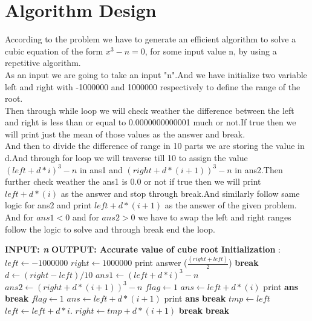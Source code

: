 \documentclass[conference]{IEEEtran}
\begin{document}
\section{\textbf{Algorithm Design}}
According to the problem we have to generate an efficient algorithm  to solve a cubic equation of the form $x^3-n=0$, for some input value n, by using a repetitive algorithm.\\

As an input we are going to take an input "n".And we have initialize two variable left and right with -1000000 and 1000000 respectively to define the range of the root.\\

Then through while loop we will check weather the difference between the left and right is less than or equal to 0.0000000000001 much or not.If true then we will print just the mean of those values as the answer and break.\\

And then to divide the difference of range in 10 parts we are storing the value in d.And through for loop we will traverse till 10  to assign the value $(left + d*i)^3 - n$ in ans1 and $(right + d*(i+1))^3 - n$ in ans2.Then further check weather the ans1 is 0.0 or not if true then we will print $left+d*(i)$ as the answer and stop through break.And similarly follow same logic for ans2 and print $left+d*(i+1)$ as the answer of the given problem.\\

And for $ans1 < 0$ and for $ans2 > 0$ we have to swap the left and right ranges follow the logic to solve and through break end the loop.\\


\begin{algorithm}[H]
\caption{}
\end{algorithm}
\begin{algorithmic}[1]
\STATE \textbf{INPUT: \textit{n}}
\STATE \textbf{OUTPUT: Accurate value of cube root}
\STATE \textbf{Initialization} : $\textit{left} \gets -1000000$ $\textit{right} \gets 1000000$ 
   	\STATE print answer ($\frac{(right+left)}{2}$)
    \STATE \textbf{break}
    \ENDIF
    \STATE $d \gets (right-left)/10 $
    	\STATE $ans1 \gets (left + d*i)^3 - n$
        \STATE $ans2 \gets (right+ d*(i+1))^3-n$
        	\STATE $flag \gets 1$
            \STATE $ans \gets left+d*(i)$
            \STATE print \textbf{ans}
            \STATE \textbf{break}
        \ENDIF
        	\STATE $flag \gets 1$
            \STATE $ans \gets left+d*(i+1)$
            \STATE print \textbf{ans}
            \STATE \textbf{break}
        \ENDIF
        	\STATE $tmp \gets left$
            \STATE $left \gets left+d*i$.
            \STATE $right \gets tmp+d*(i+1)$
            \STATE \textbf{break}
        \ENDIF
    \ENDFOR
    	\STATE \textbf{break}
    \ENDIF
\ENDWHILE
\end{algorithmic}
\end{document}
